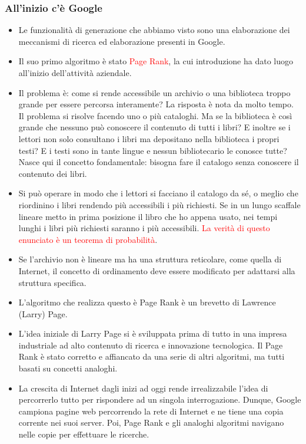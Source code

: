 \documentclass[xcolor=svgnames]{beamer}
\newcommand{\rosso}[1]{\textcolor{red}{#1}}
\renewcommand{\emph}{\rosso}
\begin{document}
\begin{frame}\small\frametitle{All'inizio c'è Google}

  \begin{itemize}
  \item
    Le funzionalità di generazione che abbiamo visto sono una elaborazione dei meccanismi di ricerca ed elaborazione presenti in Google.
 \item    
  Il suo primo algoritmo è stato \emph{Page Rank}, la cui introduzione ha dato luogo all'inizio dell'attività aziendale.
\item 
Il problema è: come si rende accessibile un archivio o una biblioteca troppo grande per essere percorsa interamente? La risposta è nota da molto tempo. Il problema si risolve facendo uno o più cataloghi. Ma se la biblioteca è così grande che nessuno può conoscere il contenuto di tutti i libri? E inoltre se i lettori non solo consultano i libri ma depositano nella biblioteca i propri testi? E i testi sono in tante lingue e nessun bibliotecario le conosce tutte? Nasce qui il concetto fondamentale: bisogna fare il catalogo senza conoscere il contenuto dei libri.
\item 
Si può operare in modo che i lettori si facciano il catalogo da sé, o meglio che riordinino i libri rendendo più accessibili i più richiesti. Se in un lungo scaffale lineare metto in prima posizione il libro che ho appena usato, nei tempi lunghi i libri più richiesti saranno i più accessibili. \emph{La verità di questo enunciato è un teorema di probabilità}.
\item
Se l'archivio non è lineare ma ha una struttura reticolare, come quella di Internet, il concetto di ordinamento deve essere modificato per adattarsi alla struttura specifica.
\item 
L'algoritmo che realizza questo è Page Rank è un brevetto di Lawrence (Larry) Page.
\item
L'idea iniziale di Larry Page si è sviluppata prima di tutto in una impresa industriale ad alto contenuto di ricerca e innovazione tecnologica. Il Page Rank è stato corretto e affiancato da una serie di altri algoritmi, ma tutti basati su concetti analoghi.
\item
  La crescita di Internet dagli inizi ad oggi rende irrealizzabile l'idea di percorrerlo tutto per rispondere ad un singola interrogazione. Dunque, Google campiona pagine web percorrendo la rete di Internet e ne tiene una copia corrente nei suoi server. Poi, Page Rank e gli analoghi algoritmi navigano nelle copie per effettuare le ricerche.

\end{itemize}
\end{frame}
\end{document}
